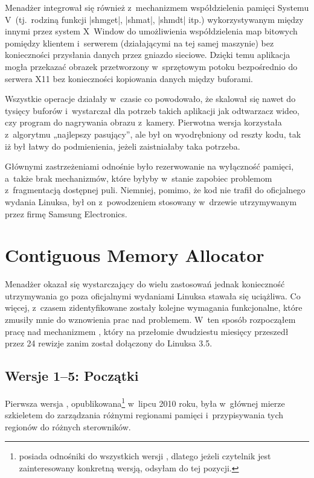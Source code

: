 Menadżer  integrował się również z~mechanizmem współdzielenia
pamięci Systemu V~(tj.\ rodziną funkcji \code|shmget|, \code|shmat|,
\code|shmdt| itp.) wykorzystywanym między innymi przez system X~Window
do umożliwienia współdzielenia map bitowych pomiędzy klientem
i~serwerem (działającymi na tej samej maszynie) bez konieczności
przysłania danych przez gniazdo sieciowe.  Dzięki temu aplikacja mogła
przekazać obrazek przetworzony w~sprzętowym potoku bezpośrednio do
serwera X11 bez konieczności kopiowania danych między buforami.

Wszystkie operacje  działały w~czasie  co powodowało,
że  skalował się nawet do tysięcy buforów i~wystarczał dla potrzeb
takich aplikacji jak odtwarzacz wideo, czy program do nagrywania
obrazu z~kamery.  Pierwotna wersja korzystała z~algorytmu „najlepszy
pasujący”, ale był on wyodrębniony od reszty kodu, tak iż był łatwy do
podmienienia, jeżeli zaistniałaby taka potrzeba.

Głównymi zastrzeżeniami odnośnie  było rezerwowanie na wyłączność
pamięci, a~także brak mechanizmów, które byłyby w~stanie zapobiec
problemom z~fragmentacją dostępnej puli.  Niemniej, pomimo, że kod nie
trafił do oficjalnego wydania Linuksa, był on z~powodzeniem stosowany
w~drzewie utrzymywanym przez firmę Samsung Electronics.


\section{Contiguous Memory Allocator}

Menadżer  okazał się wystarczający do wielu zastosowań jednak
konieczność utrzymywania go poza oficjalnymi wydaniami Linuksa stawała
się uciążliwa.  Co więcej, z~czasem zidentyfikowane zostały kolejne
wymagania funkcjonalne, które zmusiły mnie do wznowienia prac nad
problemem.  W~ten sposób rozpocząłem pracę nad mechanizmem ,
który na przełomie dwudziestu miesięcy przeszedł przez 24 rewizje
zanim został dołączony do Linuksa 3.5.

\subsection{Wersje 1--5: Początki}\label{sec:evo-cma}

Pierwsza wersja , opublikowana\footnote{\autocite{patch:cma-24}
  posiada odnośniki do wszystkich wersji , dlatego jeżeli czytelnik
  jest zainteresowany konkretną wersją, odsyłam do tej pozycji.}
w~lipcu 2010 roku, była w~głównej mierze szkieletem do zarządzania
różnymi regionami pamięci i~przypisywania tych regionów do różnych
sterowników.

